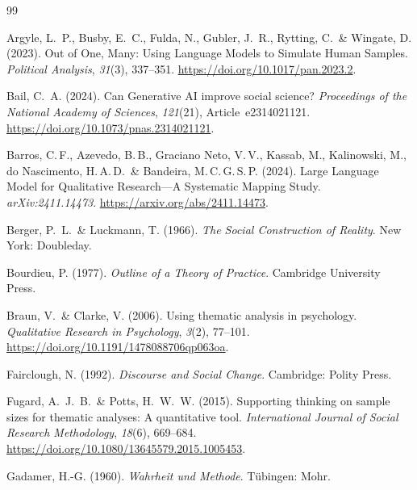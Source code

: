 \documentclass[11pt,a4paper]{article}
\begin{document}
\newpage


\begin{thebibliography}{99}

  Argyle, L.~P., Busby, E.~C., Fulda, N., Gubler, J.~R., Rytting, C.~\& Wingate, D. (2023).
  Out of One, Many: Using Language Models to Simulate Human Samples.
  \textit{Political Analysis}, \textit{31}(3), 337--351. \url{https://doi.org/10.1017/pan.2023.2}.

  Bail, C.~A. (2024).
  Can Generative AI improve social science?
  \textit{Proceedings of the National Academy of Sciences}, \textit{121}(21), Article~e2314021121. \url{https://doi.org/10.1073/pnas.2314021121}.

  Barros, C.\,F., Azevedo, B.\,B., Graciano Neto, V.\,V., Kassab, M., Kalinowski, M., do Nascimento, H.\,A.\,D.~\& Bandeira, M.\,C.\,G.\,S.\,P. (2024).
  Large Language Model for Qualitative Research---A Systematic Mapping Study.
  \textit{arXiv:2411.14473}. \url{https://arxiv.org/abs/2411.14473}.

  Berger, P.~L.~\& Luckmann, T. (1966).
  \textit{The Social Construction of Reality}.
  New York: Doubleday.

  Bourdieu, P. (1977).
  \textit{Outline of a Theory of Practice}.
  Cambridge University Press.

  Braun, V.~\& Clarke, V. (2006).
  Using thematic analysis in psychology.
  \textit{Qualitative Research in Psychology}, \textit{3}(2), 77--101. \url{https://doi.org/10.1191/1478088706qp063oa}.

  Fairclough, N. (1992).
  \textit{Discourse and Social Change}.
  Cambridge: Polity Press.

  Fugard, A.~J.~B.~\& Potts, H.~W.~W. (2015).
  Supporting thinking on sample sizes for thematic analyses: A quantitative tool.
  \textit{International Journal of Social Research Methodology}, \textit{18}(6), 669--684. \url{https://doi.org/10.1080/13645579.2015.1005453}.

  Gadamer, H.-G. (1960).
  \textit{Wahrheit und Methode}.
  Tübingen: Mohr.


\end{thebibliography}
\end{document}
